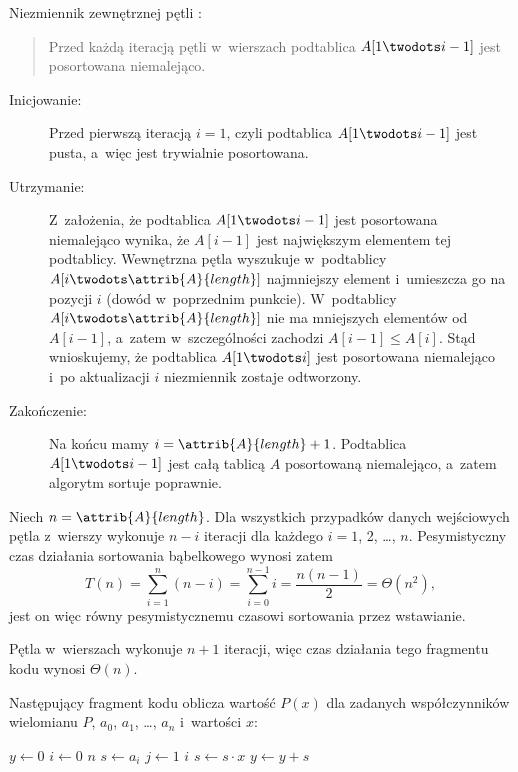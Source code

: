 \subproblem %
Niezmiennik zewnętrznej pętli :
\begin{quote}
Przed każdą iteracją pętli  w~wierszach  podtablica $A[1\twodots i-1]$ jest posortowana niemalejąco.
\end{quote}
\begin{description}
	\item[Inicjowanie:] Przed pierwszą iteracją $i=1$, czyli podtablica $A[1\twodots i-1]$ jest pusta, a~więc jest trywialnie posortowana.
	\item[Utrzymanie:] Z~założenia, że podtablica $A[1\twodots i-1]$ jest posortowana niemalejąco wynika, że $A[i-1]$ jest największym elementem tej podtablicy.
Wewnętrzna pętla  wyszukuje w~podtablicy $A[i\twodots\attrib{A}{length}]$ najmniejszy element i~umieszcza go na pozycji $i$ (dowód w~poprzednim punkcie).
W~podtablicy $A[i\twodots\attrib{A}{length}]$ nie ma mniejszych elementów od $A[i-1]$, a~zatem w~szczególności zachodzi $A[i-1]\le A[i]$.
Stąd wnioskujemy, że podtablica $A[1\twodots i]$ jest posortowana niemalejąco i~po aktualizacji $i$ niezmiennik zostaje odtworzony.
	\item[Zakończenie:] Na końcu mamy $i=\attrib{A}{length}+1$.
Podtablica $A[1\twodots i-1]$ jest całą tablicą $A$ posortowaną niemalejąco, a~zatem algorytm sortuje poprawnie.
\end{description}

\subproblem %
Niech $n=\attrib{A}{length}$.
Dla wszystkich przypadków danych wejściowych pętla  z~wierszy  wykonuje $n-i$ iteracji dla każdego $i=1$, 2, \dots, $n$.
Pesymistyczny czas działania sortowania bąbelkowego wynosi zatem
\[
	T(n) = \sum_{i=1}^n(n-i) = \sum_{i=0}^{n-1}i = \frac{n(n-1)}{2} = \Theta(n^2),
\]
jest on więc równy pesymistycznemu czasowi sortowania przez wstawianie.


\subproblem %
Pętla  w~wierszach  wykonuje $n+1$ iteracji, więc czas działania tego fragmentu kodu wynosi $\Theta(n)$.

\subproblem %
Następujący fragment kodu oblicza wartość $P(x)$ dla zadanych współczynników wielomianu $P$, $a_0$, $a_1$, \dots, $a_n$ i~wartości $x$:
\begin{codebox}
\li	$y\gets0$
\li	\For $i\gets0$ \To $n$
\li		\Do
			$s\gets a_i$
\li			\For $j\gets1$ \To $i$ \label{li:naive-polynomial-evaluation-for-begin}
\li				\Do $s\gets s\cdot x$
				\End \label{li:naive-polynomial-evaluation-for-end}
\li			$y\gets y+s$
		\End
\end{codebox}

